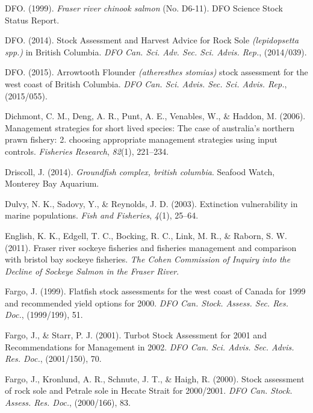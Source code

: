 \documentclass[12pt,]{scrartcl}
\begin{document}
\hypertarget{ref-DFO1999Fraser-River-Ch}{}
DFO. (1999). \emph{Fraser river chinook salmon} (No. D6-11). DFO Science
Stock Status Report.

\hypertarget{ref-dfo2014stock-asse}{}
DFO. (2014). Stock Assessment and Harvest Advice for Rock Sole
\emph{(lepidopsetta spp.)} in British Columbia. \emph{DFO Can. Sci. Adv.
Sec. Sci. Advis. Rep.}, (2014/039).

\hypertarget{ref-dfo2015arrowtooth}{}
DFO. (2015). Arrowtooth Flounder \emph{(atheresthes stomias)} stock
assessment for the west coast of British Columbia. \emph{DFO Can. Sci.
Advis. Sec. Sci. Advis. Rep.}, (2015/055).

\hypertarget{ref-dichmont2006management2}{}
Dichmont, C. M., Deng, A. R., Punt, A. E., Venables, W., \& Haddon, M.
(2006). Management strategies for short lived species: The case of
australia's northern prawn fishery: 2. choosing appropriate management
strategies using input controls. \emph{Fisheries Research},
\emph{82}(1), 221--234.

\hypertarget{ref-Driscoll2014Groundfish-comp}{}
Driscoll, J. (2014). \emph{Groundfish complex, british columbia}.
Seafood Watch, Monterey Bay Aquarium.

\hypertarget{ref-dulvy2003extinction}{}
Dulvy, N. K., Sadovy, Y., \& Reynolds, J. D. (2003). Extinction
vulnerability in marine populations. \emph{Fish and Fisheries},
\emph{4}(1), 25--64.

\hypertarget{ref-english2011fraser}{}
English, K. K., Edgell, T. C., Bocking, R. C., Link, M. R., \& Raborn,
S. W. (2011). Fraser river sockeye fisheries and fisheries management
and comparison with bristol bay sockeye fisheries. \emph{The Cohen
Commission of Inquiry into the Decline of Sockeye Salmon in the Fraser
River}.

\hypertarget{ref-fargo1999flatfish-s}{}
Fargo, J. (1999). Flatfish stock assessments for the west coast of
Canada for 1999 and recommended yield options for 2000. \emph{DFO Can.
Stock. Assess. Sec. Res. Doc.}, (1999/199), 51.

\hypertarget{ref-fargo2001turbot-sto}{}
Fargo, J., \& Starr, P. J. (2001). Turbot Stock Assessment for 2001 and
Recommendations for Management in 2002. \emph{DFO Can. Sci. Advis. Sec.
Advis. Res. Doc.}, (2001/150), 70.

\hypertarget{ref-fargo2000stock-asse}{}
Fargo, J., Kronlund, A. R., Schnute, J. T., \& Haigh, R. (2000). Stock
assessment of rock sole and Petrale sole in Hecate Strait for 2000/2001.
\emph{DFO Can. Stock. Assess. Res. Doc.}, (2000/166), 83.
\end{document}
